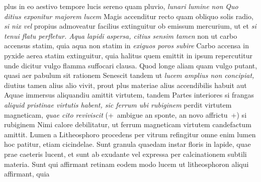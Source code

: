plus in eo aestivo tempore lucis sereno quam pluvio, \textit{lunari lumine non } \textit{Quo ditius exponitur majorem lucem } Magis accenditur recto quam obliquo solis radio\protect{}, \textit{si nix vel } propius admoveatur facilius extinguitur ob emissum mercurium, ut et \textit{si tenui flatu perfletur. Aqua lapidi aspersa, citius sensim tamen } non ut carbo\protect{} accensus statim, quia aqua non statim in 
\textit{exiguos poros\protect{} subire } Carbo accensa in pyxide\protect{} aerea statim extinguitur, quia halitus quem emittit in ipsum repercutitur unde dicitur vulgo flamma suffocari clausa. Quod longe aliam quam vulgo putant, quasi aer pabulum sit rationem  Senescit tandem ut \textit{lucem amplius non concipiat,} diutius tamen alius alio vivit, prout plus materiae alius accendibilis habuit aut  Aquae immersus aliquandiu amittit virtutem, tandem  Partes interiores si frangas \textit{aliquid pristinae virtutis habent, sic ferrum ubi rubiginem
}
 perdit virtutem magneticam, \textit{quae cito reviviscit} (+~ambigue an sponte, an novo affrictu~+) si rubiginem  Nimi calore debilitatur, ut ferrum magneticam virtutem candefactum amittit. Lumen a Litheosphoro\protect{} procedens per vitrum refingitur omne enim lumen hoc patitur, etiam cicindelae\protect{}. Sunt granula quaedam instar floris in lapide, quae prae caeteris lucent, et sunt ab exudante vel expressa per calcinationem\protect{} subtili materia. Sunt qui affirmant retinam\protect{} eodem modo lucem  ut litheosphoron aliqui affirmant, quia
